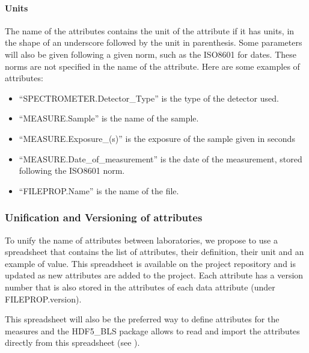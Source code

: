 \documentclass[letterpaper,10pt,english]{sphinxmanual}
\begin{document}
\paragraph{Units}
\label{\detokenize{source/file_format:units}}
\sphinxAtStartPar
The name of the attributes contains the unit of the attribute if it has units, in the shape of an underscore followed by the unit in parenthesis. Some parameters will also be given following a given norm, such as the ISO8601 for dates. These norms are not specified in the name of the attribute. Here are some examples of attributes:
\begin{itemize}
\item {} 
\sphinxAtStartPar
“SPECTROMETER.Detector\_Type” is the type of the detector used.

\item {} 
\sphinxAtStartPar
“MEASURE.Sample” is the name of the sample.

\item {} 
\sphinxAtStartPar
“MEASURE.Exposure\_(s)” is the exposure of the sample given in seconds

\item {} 
\sphinxAtStartPar
“MEASURE.Date\_of\_measurement” is the date of the measurement, stored following the ISO8601 norm.

\item {} 
\sphinxAtStartPar
“FILEPROP.Name” is the name of the file.

\end{itemize}


\subsubsection{Unification and Versioning of attributes}
\label{\detokenize{source/file_format:unification-and-versioning-of-attributes}}
\sphinxAtStartPar
To unify the name of attributes between laboratories, we propose to use a spreadsheet that contains the list of attributes, their definition, their unit and an example of value. This spreadsheet is available on the project repository and is updated as new attributes are added to the project. Each attribute has a version number that is also stored in the attributes of each data attribute (under FILEPROP.version).

\sphinxAtStartPar
This spreadsheet will also be the preferred way to define attributes for the measures and the HDF5\_BLS package allows to read and import the attributes directly from this spreadsheet (see ).
\end{document}
